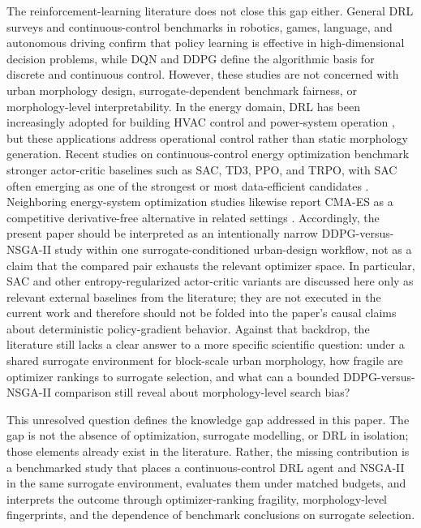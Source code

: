 \documentclass[final,3p,times]{elsarticle}
\begin{document}
The reinforcement-learning literature does not close this gap either. General DRL surveys \cite{ref26} and continuous-control benchmarks in robotics, games, language, and autonomous driving \cite{ref27,ref28,ref29,ref30} confirm that policy learning is effective in high-dimensional decision problems, while DQN \cite{ref31} and DDPG \cite{ref32} define the algorithmic basis for discrete and continuous control. However, these studies are not concerned with urban morphology design, surrogate-dependent benchmark fairness, or morphology-level interpretability. In the energy domain, DRL has been increasingly adopted for building HVAC control \cite{ref33,ref34} and power-system operation \cite{ref35,ref36}, but these applications address operational control rather than static morphology generation. Recent studies on continuous-control energy optimization benchmark stronger actor-critic baselines such as SAC, TD3, PPO, and TRPO, with SAC often emerging as one of the strongest or most data-efficient candidates \cite{ref37,ref38,ref39}. Neighboring energy-system optimization studies likewise report CMA-ES as a competitive derivative-free alternative in related settings \cite{ref40}. Accordingly, the present paper should be interpreted as an intentionally narrow DDPG-versus-NSGA-II study within one surrogate-conditioned urban-design workflow, not as a claim that the compared pair exhausts the relevant optimizer space. In particular, SAC and other entropy-regularized actor-critic variants are discussed here only as relevant external baselines from the literature; they are not executed in the current work and therefore should not be folded into the paper's causal claims about deterministic policy-gradient behavior. Against that backdrop, the literature still lacks a clear answer to a more specific scientific question: under a shared surrogate environment for block-scale urban morphology, how fragile are optimizer rankings to surrogate selection, and what can a bounded DDPG-versus-NSGA-II comparison still reveal about morphology-level search bias?

This unresolved question defines the knowledge gap addressed in this paper. The gap is not the absence of optimization, surrogate modelling, or DRL in isolation; those elements already exist in the literature. Rather, the missing contribution is a benchmarked study that places a continuous-control DRL agent and NSGA-II in the same surrogate environment, evaluates them under matched budgets, and interprets the outcome through optimizer-ranking fragility, morphology-level fingerprints, and the dependence of benchmark conclusions on surrogate selection.
\end{document}
